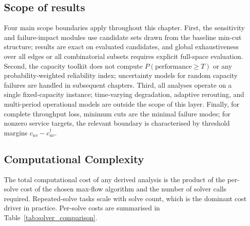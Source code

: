 \documentclass[12pt]{report}
\begin{document}
\subsection{Scope of results}
Four main scope boundaries apply throughout this chapter.
First, the sensitivity and failure-impact modules use candidate sets drawn from the baseline min-cut structure; results are exact on evaluated candidates, and global exhaustiveness over all edges or all combinatorial subsets requires explicit full-space evaluation. Second, the capacity toolkit does not compute $P(\text{performance}\ge T)$ or any probability-weighted reliability index; uncertainty models for random capacity failures are handled in subsequent chapters. Third, all analyses operate on a single fixed-capacity instance; time-varying degradation, adaptive rerouting, and multi-period operational models are outside the scope of this layer. Finally, for complete throughput loss, minimum cuts are the minimal failure modes; for nonzero service targets, the relevant boundary is characterised by threshold margins 
$c_{uv} - c^\dagger_{uv}$.

\subsection{Computational Complexity}
The total computational cost of any derived analysis is the product of the per-solve cost of the chosen max-flow algorithm and the number of solver calls required.  Repeated-solve tasks scale with solve count, which is the dominant cost driver in practice. Per-solve costs are summarised in Table~\ref{tab:solver_comparison}.
\end{document}
